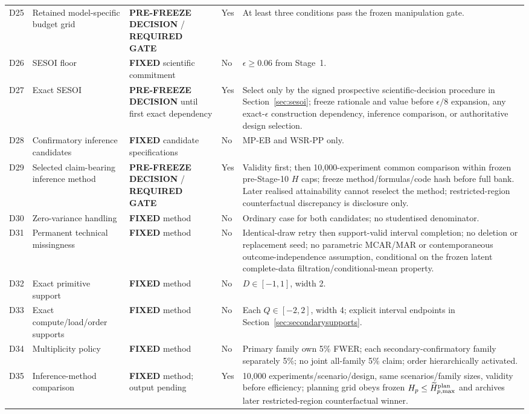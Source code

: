 \documentclass[11pt,a4paper]{article}
\newcommand{\FIXED}{\textbf{FIXED}}
\newcommand{\PFD}{\textbf{PRE-FREEZE DECISION}}
\newcommand{\GATE}{\textbf{REQUIRED GATE}}
\begin{document}
\begin{longtable}{p{}p{}p{}p{}p{}}
D25 & Retained model-specific budget grid & \PFD{} / \GATE{} & Yes & At least three conditions pass the frozen manipulation gate. \\
D26 & SESOI floor & \FIXED{} scientific commitment & No & $\epsilon\ge0.06$ from Stage~1. \\
D27 & Exact SESOI & \PFD{} until first exact dependency & Yes & Select only by the signed prospective scientific-decision procedure in Section~\ref{sec:sesoi}; freeze rationale and value before $\epsilon/8$ expansion, any exact-$\epsilon$ construction dependency, inference comparison, or authoritative design selection. \\
D28 & Confirmatory inference candidates & \FIXED{} candidate specifications & No & MP-EB and WSR-PP only. \\
D29 & Selected claim-bearing inference method & \PFD{} / \GATE{} & Yes & Validity first; then 10,000-experiment common comparison within frozen pre-Stage-10 $H$ caps; freeze method/formulas/code hash before full bank. Later realised attainability cannot reselect the method; restricted-region counterfactual discrepancy is disclosure only. \\
D30 & Zero-variance handling & \FIXED{} method & No & Ordinary case for both candidates; no studentised denominator. \\
D31 & Permanent technical missingness & \FIXED{} method & No & Identical-draw retry then support-valid interval completion; no deletion or replacement seed; no parametric MCAR/MAR or contemporaneous outcome-independence assumption, conditional on the frozen latent complete-data filtration/conditional-mean property. \\
D32 & Exact primitive support & \FIXED{} method & No & $D\in[-1,1]$, width 2. \\
D33 & Exact compute/load/order supports & \FIXED{} method & No & Each $Q\in[-2,2]$, width 4; explicit interval endpoints in Section~\ref{sec:secondarysupports}. \\
D34 & Multiplicity policy & \FIXED{} method & No & Primary family own 5\% FWER; each secondary-confirmatory family separately 5\%; no joint all-family 5\% claim; order hierarchically activated. \\
D35 & Inference-method comparison & \FIXED{} method; output pending & Yes & 10,000 experiments/scenario/design, same scenarios/family sizes, validity before efficiency; planning grid obeys frozen $H_p\le\widetilde H_{p,\max}^{\rm plan}$ and archives later restricted-region counterfactual winner. \\

\end{longtable}
\end{document}
